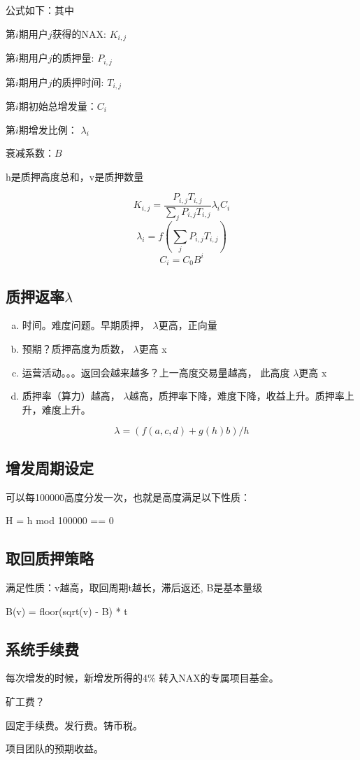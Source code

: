 公式如下：其中

        第\(i\)期用户\(j\)获得的NAX: \(K_{i,j}\)

        第\(i\)期用户\(j\)的质押量: \(P_{i,j}\)

        第\(i\)期用户\(j\)的质押时间: \(T_{i,j}\)

        第\(i\)期初始总增发量：\(C_i\)

        第\(i\)期增发比例： \(\lambda_i\)

        衰减系数：\(B\)

        h是质押高度总和，v是质押数量

\begin{equation}
  K_{i,j} = \frac{P_{i,j} T_{i,j}}{\sum_j P_{i,j} T_{i,j}} \lambda_i C_i
\end{equation}
\begin{equation}
  \lambda_i = f(\sum_j P_{i,j} T_{i,j})
\end{equation}
\begin{equation}
  C_i = C_0 B^i
\end{equation}

\subsection{质押返率\(\lambda\)}
\begin{enumerate}[a.]
  \item 时间。难度问题。早期质押， \(\lambda\)更高，正向量
  \item 预期？质押高度为质数， \(\lambda\)更高 x
  \item 运营活动。。。返回会越来越多？上一高度交易量越高， 此高度 \(\lambda\)更高 x
  \item 质押率（算力）越高， \(\lambda\)越高，质押率下降，难度下降，收益上升。质押率上升，难度上升。
\end{enumerate}

\begin{equation}
\lambda = (f(a, c, d) + g(h) b) / h
\end{equation}

\subsection{增发周期设定}
可以每100000高度分发一次，也就是高度满足以下性质：

H = h mod 100000 == 0

\subsection{取回质押策略}
满足性质：v越高，取回周期t越长，滞后返还, B是基本量级

B(v) =  floor(sqrt(v) - B) * t

\subsection{系统手续费}
每次增发的时候，新增发所得的4\% 转入NAX的专属项目基金。

矿工费？

固定手续费。发行费。铸币税。

项目团队的预期收益。

